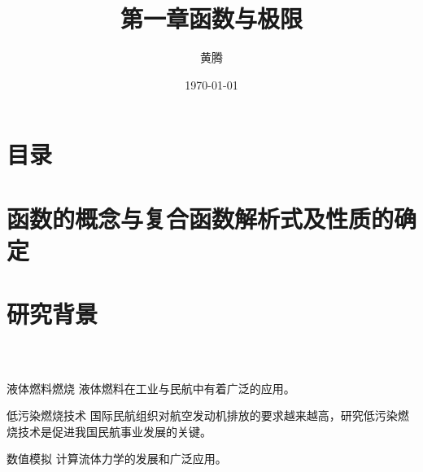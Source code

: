 \documentclass[compress,8pt,t]{beamer}
\title{第一章\quad 函数与极限}
\author{黄腾}
\institute[北京科技大学 学业中心]{北京科技大学\\ 学生学习与发展指导中心}
\date{\today}
\begin{document}
\maketitle

\section*{目录}
\begin{frame}
  \frametitle{\secname}
  \tableofcontents
\end{frame}

\section{函数的概念与复合函数解析式及性质的确定}
\begin{frame}[t]{\secname}
\end{frame}

\section{研究背景}

\begin{frame}
  \frametitle{\secname~ }
  \begin{block}{液体燃料燃烧}
    液体燃料在工业与民航中有着广泛的应用。
  \end{block}
  \begin{exampleblock}{低污染燃烧技术}
    国际民航组织对航空发动机排放的要求越来越高，研究低污染燃烧技术是促进我国民航事业发展的关键。
  \end{exampleblock}
  \begin{alertblock}{数值模拟}
    计算流体力学的发展和广泛应用。
  \end{alertblock}
\end{frame}
\end{document}
